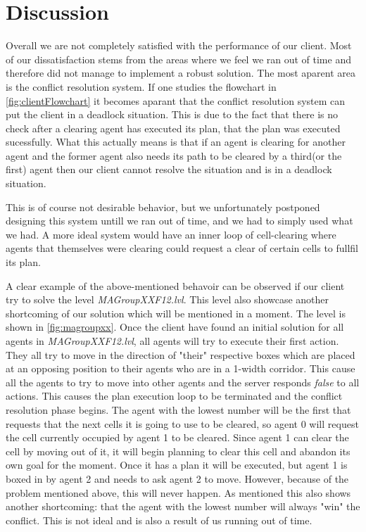 \documentclass[letterpaper]{article}
\begin{document}
\section{Discussion}
Overall we are not completely satisfied with the performance of our client. Most of our dissatisfaction stems from the areas where we feel we ran out of time and therefore did not manage to implement a robust solution. The most aparent area is the conflict resolution system. If one studies the flowchart in \ref{fig:clientFlowchart} it becomes aparant that the conflict resolution system can put the client in a deadlock situation. This is due to the fact that there is no check after a clearing agent has executed its plan, that the plan was executed sucessfully. What this actually means is that if an agent is clearing for another agent and the former agent also needs its path to be cleared by a third(or the first) agent then our client cannot resolve the situation and is in a deadlock situation.

This is of course not desirable behavior, but we unfortunately postponed designing this system untill we ran out of time, and we had to simply used what we had. A more ideal system would have an inner loop of cell-clearing where agents that themselves were clearing could request a clear of certain cells to fullfil its plan.

A clear example of the above-mentioned behavoir can be observed if our client try to solve the level \textit{MAGroupXXF12.lvl}. This level also showcase another shortcoming of our solution which will be mentioned in a moment. The level is shown in \ref{fig:magroupxx}. Once the client have found an initial solution for all agents in \textit{MAGroupXXF12.lvl}, all agents will try to execute their first action. They all try to move in the direction of "their" respective boxes which are placed at an opposing position to their agents who are in a 1-width corridor. This cause all the agents to try to move into other agents and the server responds \textit{false} to all actions. This causes the plan execution loop to be terminated and the conflict resolution phase begins. The agent with the lowest number will be the first that requests that the next cells it is going to use to be cleared, so agent 0 will request the cell currently occupied by agent 1 to be cleared. Since agent 1 can clear the cell by moving out of it, it will begin planning to clear this cell and abandon its own goal for the moment. Once it has a plan it will be executed, but agent 1 is boxed in by agent 2 and needs to ask agent 2 to move. However, because of the problem mentioned above, this will never happen. As mentioned this also shows another shortcoming: that the agent with the lowest number will always "win" the conflict. This is not ideal and is also a result of us running out of time.
\end{document}
